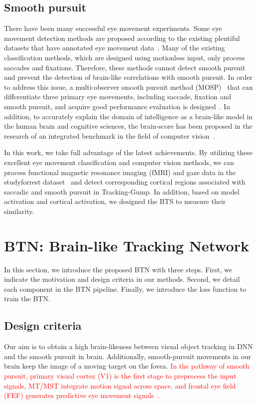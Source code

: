 \documentclass[final,3p,times,twocolumn]{elsarticle}
\begin{document}
\subsection{Smooth pursuit}
There have been many successful eye movement experiments. 
Some eye movement detection methods are proposed according to the existing plentiful datasets that have annotated eye movement data~\cite{dorr2010variability,mathe2012dynamic,hooge2017is,blstm_class}. 
Many of the existing classification methods, which are designed using motionless input, only process saccades and fixations. 
Therefore, these methods cannot detect smooth pursuit and prevent the detection of brain-like correlations with smooth pursuit. 
In order to address this issue, a multi-observer smooth pursuit method (MOSP)~\cite{mosp} that can differentiate three primary eye movements, including saccade, fixation and smooth pursuit, 
and acquire good performance evaluation is designed~\cite{blstm_class}.
In addition, to accurately explain the domain of  intelligence as a brain-like model in the human brain and cognitive sciences, 
the brain-score has been proposed in the research of an integrated benchmark in the field of computer vision~\cite{schrimpf2020integrative}. 

In this work, we take full advantage of the latest achievements. 
By utilizing these excellent eye movement classification and computer vision methods, 
we can process functional magnetic resonance imaging (fMRI) and gaze data in the studyforrest dataset~\cite{gaze_forrest} 
and detect corresponding cortical regions associated with saccadic and smooth pursuit in Tracking-Gump.
In addition, based on model activation and cortical activation, we designed the BTS to measure their similarity.



\section{BTN: Brain-like Tracking Network} 
In this section, we introduce the proposed BTN with three steps. 
First, we indicate the motivation and design criteria in our methods.
Second, we detail each component in the BTN pipeline. 
Finally, we introduce the loss function to train the BTN. \par

\subsection{Design criteria}
Our aim is to obtain a high brain-likeness between visual object tracking in DNN and the smooth pursuit in brain.
Additionally, smooth-pursuit movements in our brain keep the image of a moving target on the fovea. 
\textcolor{red}{
In the pathway of smooth pursuit,
primary visual cortex (V1) is the first stage to preprocess the input signals, 
MT/MST \textcolor{red}{integrate} motion signal across space,
and frontal eye field (FEF) generates predictive eye movement signals~\cite{b11,b13,b14}.
}\par
\end{document}
